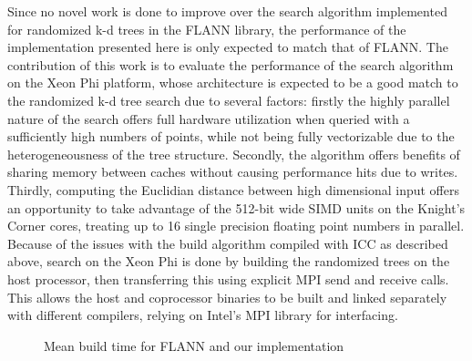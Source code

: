    Since no novel work is done to improve over the search algorithm implemented for randomized k-d trees in the FLANN library, the performance of the implementation presented here is only expected to match that of FLANN. The contribution of this work is to evaluate the performance of the search algorithm on the Xeon Phi platform, whose architecture is expected to be a good match to the randomized k-d tree search due to several factors: firstly the highly parallel nature of the search offers full
  hardware utilization when queried with a sufficiently high numbers of points, while not being fully vectorizable due to the heterogeneousness of the tree structure. Secondly, the algorithm offers benefits of sharing memory between caches without causing performance hits due to writes. Thirdly, computing the Euclidian distance between high dimensional input offers an opportunity to take advantage of the 512-bit wide SIMD units on the Knight's Corner cores, treating up to 16
  single precision floating point numbers in parallel. 
  Because of the issues with the build algorithm compiled with ICC as described above, search on the Xeon Phi is done by building the randomized trees on the host processor, then transferring this using explicit MPI send and receive calls. This allows the host and coprocessor binaries to be built and linked separately with different compilers, relying on Intel's MPI library for interfacing.

  \begin{figure}[tb]
    \centering
    \resizebox{\columnwidth}{!}{}
    \caption{Mean build time for FLANN and our implementation}
    \label{fig:build_comparison}
  \end{figure}

